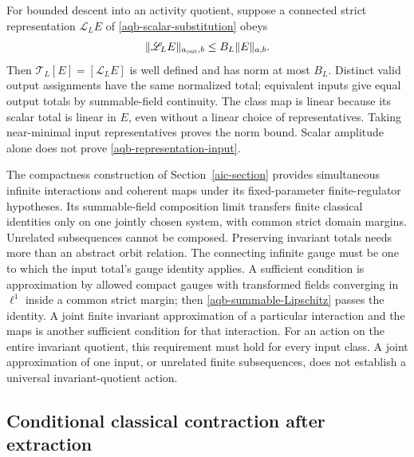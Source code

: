 \documentclass[11pt]{article}
\theoremstyle{remark}
\begin{document}
For bounded descent into an activity quotient, suppose a
connected strict representation $\mathscr L_LE$ of
\eqref{aqb-scalar-substitution} obeys
\begin{equation}
 \|\mathscr L_LE\|_{a_{\rm out},b}
                         \le B_L\|E\|_{a,b}.
 \label{aqb-representation-input}
\end{equation}
Then $\mathcal T_L[E]=[\mathscr L_LE]$ is well defined and has
norm at most $B_L$. Distinct valid output assignments have the
same normalized total; equivalent inputs give equal output
totals by summable-field continuity. The class map is linear
because its scalar total is linear in $E$, even without a linear
choice of representatives. Taking near-minimal input
representatives proves the norm bound. Scalar amplitude alone
does not prove \eqref{aqb-representation-input}.

The compactness construction of Section~\ref{aic-section}
provides simultaneous infinite interactions and coherent maps
under its fixed-parameter finite-regulator hypotheses. Its
summable-field composition limit transfers finite classical
identities only on one jointly chosen system, with common strict
domain margins. Unrelated subsequences cannot be composed.
Preserving invariant totals needs more than an abstract orbit
relation. The connecting infinite gauge must be one to which
the input total's gauge identity applies. A sufficient condition
is approximation by allowed compact gauges with transformed
fields converging in $\ell^1$ inside a common strict margin;
then \eqref{aqb-summable-Lipschitz} passes the identity. A joint
finite invariant approximation of a particular interaction and
the maps is another sufficient condition for that interaction.
For an action on the entire invariant quotient, this requirement
must hold for every input class. A joint approximation of one
input, or unrelated finite subsequences, does not establish a
universal invariant-quotient action.

\subsection{Conditional classical contraction after extraction}
\label{aqb-contraction-section}
\end{document}

